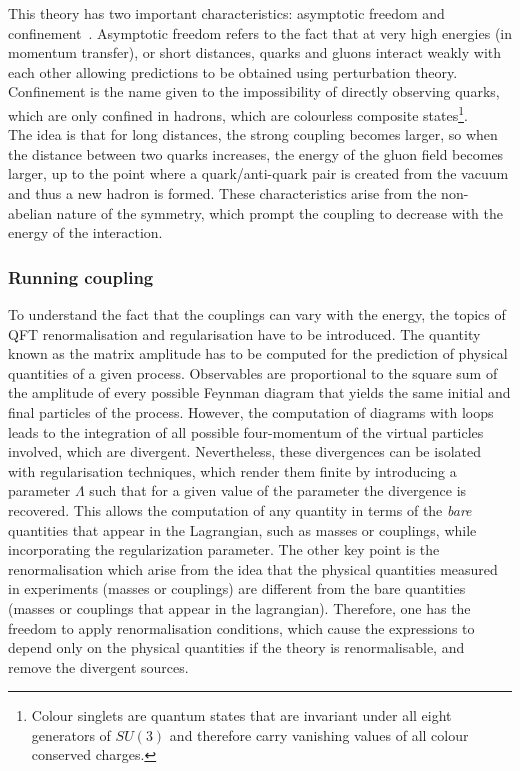 This theory has two important characteristics: asymptotic freedom and confinement~\cite{PhysRevLett.30.1346,PhysRevLett.30.1343}. Asymptotic freedom refers to the fact that at very high energies (in momentum transfer), or short distances, quarks and gluons interact weakly with each other allowing predictions to be obtained using perturbation theory. Confinement is the name given to the impossibility of directly observing quarks, which are only confined in hadrons, which are colourless composite states\footnote{Colour singlets are quantum states that are invariant under all eight generators of $SU(3)$ and therefore carry vanishing values of all colour conserved charges.}.\\

The idea is that for long distances, the strong coupling becomes larger, so when the distance between two quarks increases, the energy of the gluon field becomes larger, up to the point where a quark/anti-quark pair is created from the vacuum and thus a new hadron is formed. These characteristics arise from the non-abelian nature of the symmetry, which prompt the coupling to decrease with the energy of the interaction.

\subsubsection{Running coupling}

To understand the fact that the couplings can vary with the energy, the topics of \acrshort{QFT} renormalisation and regularisation have to be introduced. The quantity known as the matrix amplitude has to be computed for the prediction of physical quantities of a given process. Observables are proportional to the square sum of the amplitude of every possible Feynman diagram that yields the same initial and final particles of the process. However, the computation of diagrams with loops leads to the integration of all possible four-momentum of the virtual particles involved, which are divergent. Nevertheless, these divergences can be isolated with regularisation techniques, which render them finite by introducing a parameter $\Lambda$ such that for a given value of the parameter the divergence is recovered. This allows the computation of any quantity in terms of the \textit{bare} quantities that appear in the Lagrangian, such as masses or couplings, while incorporating the regularization parameter. The other key point is the renormalisation which arise from the idea that the physical quantities measured in experiments (masses or couplings) are different from the bare quantities (masses or couplings that appear in the lagrangian). Therefore, one has the freedom to apply renormalisation conditions, which cause the expressions to depend only on the physical quantities if the theory is renormalisable, and remove the divergent sources.\\

